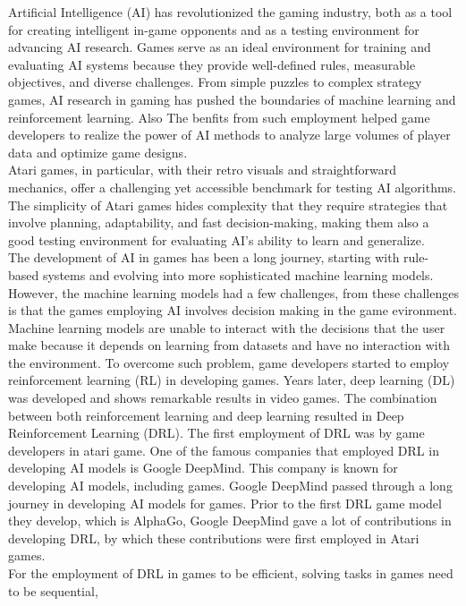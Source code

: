 Artificial Intelligence (AI) has revolutionized the gaming industry, 
both as a tool for creating intelligent in-game opponents and as a 
testing environment for advancing AI research. Games serve as an ideal 
environment for training and evaluating AI systems because they provide 
well-defined rules, measurable objectives, and diverse challenges. From 
simple puzzles to complex strategy games, AI research in gaming has pushed 
the boundaries of machine learning and reinforcement learning.
Also The benfits from such employment helped game developers to realize 
the power of AI methods to analyze large volumes of player data and optimize 
game designs. \cite{I1} \\
Atari games, in particular, with their retro visuals and straightforward mechanics, 
offer a challenging yet accessible benchmark for testing AI algorithms. The simplicity 
of Atari games hides complexity that they require strategies that involve planning, 
adaptability, and fast decision-making, making them also a good testing environment for 
evaluating AI's ability to learn and generalize.\\
The development of AI in games has been a long journey, starting with rule-based systems 
and evolving into more sophisticated machine learning models. However, the machine 
learning models had a few challenges, from these challenges is that the games employing 
AI involves decision making in the game evironment. Machine learning models are unable 
to interact with the decisions that the user make because it depends on learning from 
datasets and have no interaction with the environment. To overcome such problem, 
game developers started to employ reinforcement learning (RL) in developing games. 
Years later, deep learning (DL) was developed and shows remarkable results in video games\cite{I2}. 
The combination between both reinforcement learning and deep learning resulted in Deep Reinforcement 
Learning (DRL). The first employment of DRL was by game developers in atari game\cite{I3}.
One of the famous companies that employed DRL in developing AI models is Google DeepMind. 
This company is known for developing AI models, including games. Google DeepMind passed through a 
long journey in developing AI models for games. Prior to the first DRL game model they develop, 
which is AlphaGo, Google DeepMind gave a lot of contributions in developing DRL, by which these 
contributions were first employed in Atari games.\\
For the employment of DRL in games to be efficient, solving tasks in games need to be sequential, 
